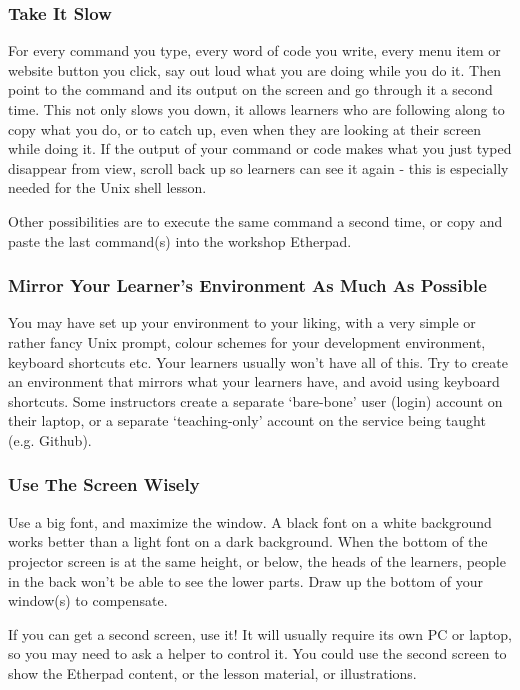 \subsubsection*{Take It Slow}

For every command you type, every word of code you write, every menu
item or website button you click, say out loud what you are doing
while you do it.  Then point to the command and its output on the
screen and go through it a second time.  This not only slows you down,
it allows learners who are following along to copy what you do, or to
catch up, even when they are looking at their screen while doing it.
If the output of your command or code makes what you just typed
disappear from view, scroll back up so learners can see it again -
this is especially needed for the Unix shell lesson.

Other possibilities are to execute the same command a second time, or
copy and paste the last command(s) into the workshop Etherpad.

\subsubsection*{Mirror Your Learner's Environment As Much As Possible}

You may have set up your environment to your liking, with a very
simple or rather fancy Unix prompt, colour schemes for your
development environment, keyboard shortcuts etc.  Your learners
usually won't have all of this.  Try to create an environment that
mirrors what your learners have, and avoid using keyboard shortcuts.
Some instructors create a separate `bare-bone' user (login) account on
their laptop, or a separate `teaching-only' account on the service
being taught (e.g. Github).

\subsubsection*{Use The Screen Wisely}

Use a big font, and maximize the window.  A black font on a white
background works better than a light font on a dark background.  When
the bottom of the projector screen is at the same height, or below,
the heads of the learners, people in the back won't be able to see the
lower parts.  Draw up the bottom of your window(s) to compensate.

If you can get a second screen, use it! It will usually require its
own PC or laptop, so you may need to ask a helper to control it.  You
could use the second screen to show the Etherpad content, or the
lesson material, or illustrations.

